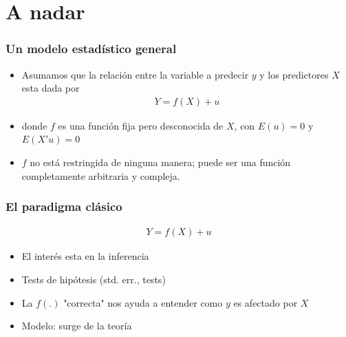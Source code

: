 \documentclass[
  shownotes,
  xcolor={svgnames},
  hyperref={colorlinks,citecolor=DarkBlue,linkcolor=DarkRed,urlcolor=DarkBlue}
  , aspectratio=169]{beamer}
\begin{document}
\section{A nadar}
 \begin{frame}[noframenumbering]
\tableofcontents[currentsubsection]

\end{frame}
\begin{frame}
\frametitle{Un modelo estadístico general}

\begin{itemize}
\item Asumamos que la relación entre la variable a predecir $y$ y los predictores $X$ esta dada por
\medskip
\begin{align}
Y=f(X)+u
\end{align}
\medskip
\item donde $f$ es una función fija pero desconocida de $X$, con $E(u)=0$ y $E(X'u)=0$
\medskip
\item $f$ no está restringida de ninguna manera; puede ser una función completamente arbitraria y compleja.
\end{itemize}


\end{frame}
\begin{frame}
\frametitle{El paradigma clásico}


\begin{align}
Y=f(X)+u
\end{align}
\medskip
\begin{itemize}
  \item El interés esta en la inferencia
  \medskip
  \item Tests de hipótesis (std. err., tests)
  \medskip
  \item La $f(.)$ "correcta" nos ayuda a entender como $y$ es afectado por $X$
  \medskip
  \item Modelo: surge de la teoría
  
\end{itemize}

\end{frame}

\end{document}
